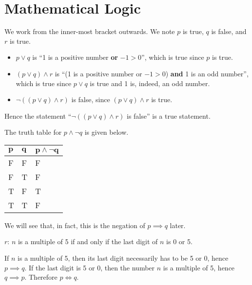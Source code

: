 \section{Mathematical Logic}
\begin{questions}
    \item We work from the inner-most bracket outwards. We note $p$ is true, $q$ is false, and $r$ is true.
    \begin{itemize}
        \item $p \lor q$ is ``1 is a positive number \textbf{or} $-1 > 0$'', which is true since $p$ is true.
        \item $(p \lor q) \land r$ is ``(1 is a positive number or $-1 > 0$) \textbf{and} 1 is an odd number'', which is true since $p \lor q$ is true and 1 is, indeed, an odd number.
        \item $\lnot((p \lor q) \land r)$ is false, since $(p \lor q) \land r$ is true.
    \end{itemize}
    Hence the statement ``$\lnot((p \lor q) \land r)$ is false'' is a true statement.
    
    \item The truth table for $p \land \lnot q$ is given below.
    \begin{table}[H]
        \centering
        \begin{tabular}{|l|l||l|}
            \hline
            $\boldsymbol{p}$ & $\boldsymbol{q}$ & $\boldsymbol{p\land \lnot q}$ \\ \hline
            F   & F   & F                  \\ \hline
            F   & T   & F                  \\ \hline
            T   & F   & T                  \\ \hline
            T   & T   & F                  \\ \hline
        \end{tabular}
    \end{table}
    
    We will see that, in fact, this is the negation of $p \implies q$ later.
    
    \item \begin{partquestions}{\roman*}
        \item $r$: $n$ is a multiple of 5 if and only if the last digit of $n$ is 0 or 5.
        \item If $n$ is a multiple of 5, then its last digit necessarily has to be 5 or 0, hence $p \implies q$. If the last digit is 5 or 0, then the number $n$ is a multiple of 5, hence $q \implies p$. Therefore $p \iff q$.
    \end{partquestions}
    

\end{questions}

